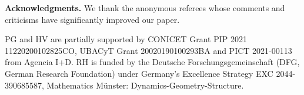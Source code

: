 \documentclass[a4paper,11pt]{amsart}
\newcommand{\red}[1]{{#1}}
\numberwithin{equation}{section}
\numberwithin{theorem}{section}
\theoremstyle{definition}
\begin{document}
\vspace*{\fill} %







%
%
%
%
%



\newpage
{\textbf{Acknowledgments.}} 
\red{We thank the anonymous referees whose comments and criticisms have significantly improved our paper.}

PG and HV are partially supported by CONICET Grant PIP 2021 11220200102825CO, UBACyT Grant 20020190100293BA and PICT 2021-00113 from Agencia I+D. RH is funded by  the Deutsche Forschungsgemeinschaft (DFG, German Research Foundation) under Germany's Excellence Strategy EXC 2044-390685587, Mathematics M\"unster: Dynamics-Geometry-Structure.




\end{document}
